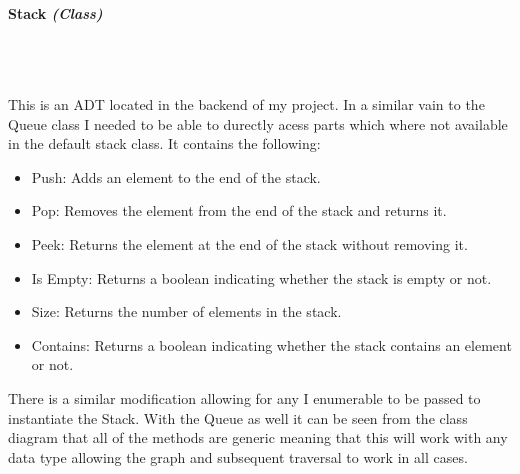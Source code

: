 \begin{FlushLeft}
    \pagebreak
\paragraph{Stack \textit{(Class)}} \mbox{} \\

    \begin{figure}[H]
        \centering
    \end{figure}\\

    This is an ADT located in the backend of my project. In a similar vain to the Queue class I needed to be able to durectly acess parts which where not available in the default stack class. It contains the following:

    \begin{itemize}
        \item Push: Adds an element to the end of the stack.
        \item Pop: Removes the element from the end of the stack and returns it.
        \item Peek: Returns the element at the end of the stack without removing it.
        \item Is Empty: Returns a boolean indicating whether the stack is empty or not.
        \item Size: Returns the number of elements in the stack.
        \item Contains: Returns a boolean indicating whether the stack contains an element or not.
    \end{itemize}

    There is a similar modification allowing for any I enumerable to be passed to instantiate the Stack. With the Queue as well it can be seen from the class diagram that all of the methods are generic meaning that this will work with any data type allowing the graph and subsequent traversal to work in all cases.\\


\end{FlushLeft}
